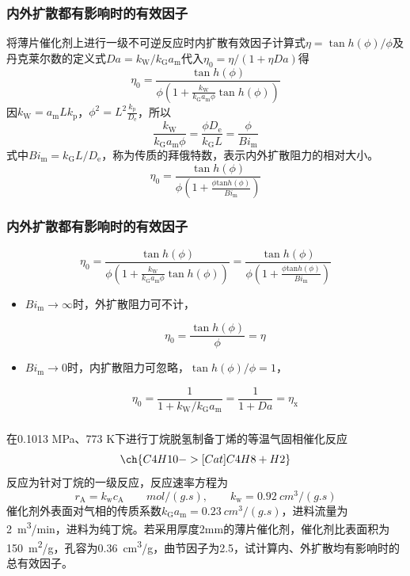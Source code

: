\documentclass[dvipsnames, svgnames, x11names]{beamer}
\begin{document}
\begin{frame}
    \frametitle{内外扩散都有影响时的有效因子}

    将薄片催化剂上进行一级不可逆反应时内扩散有效因子计算式$\eta = \tan h(\phi)/\phi$及丹克莱尔数的定义式$Da = k_{\mathrm{W}}/{k_{\mathrm{G}} a_{\mathrm{m}}}$代入$\eta_{0}=\eta /(1+\eta D a)$得
    \[
        \eta_{0}=\frac{\tan h(\phi)}{\phi (1+\frac{k_{\mathrm{W}}}{k_{\mathrm{G}} a_{\mathrm{m}} \phi} \tan h(\phi))}
    \]
    因$k_{\mathrm{W}} = a_{\mathrm{m}} L k_{\mathrm{p}}$，$\phi ^2 = L^2 \frac{k_{\mathrm{p}}}{D_{\mathrm{e}}}$，所以
    \[
        \frac{k_{\mathrm{W}}}{k_{\mathrm{G}} a_{\mathrm{m}} \phi}=\frac{\phi D_{\mathrm{e}}}{k_{\mathrm{G}} L}=\frac{\phi}{B i_{\mathrm{m}}}
    \]
    式中$B i_{\mathrm{m}} = k_{\mathrm{G}} L/D_{\mathrm{e}}$，称为传质的拜俄特数，表示内外扩散阻力的相对大小。
    \[
        \eta_{0}=\frac{\tan h(\phi)}{\phi\left(1+\frac{\phi \mathrm{tan} h(\phi)}{B i_{\mathrm{m}}}\right)}
    \]
    

\end{frame}


\begin{frame}
    \frametitle{内外扩散都有影响时的有效因子}

    \[
        \eta_{0}=\frac{\tan h(\phi)}{\phi (1+\frac{k_{\mathrm{W}}}{k_{\mathrm{G}} a_{\mathrm{m}} \phi} \tan h(\phi))}=\frac{\tan h(\phi)}{\phi\left(1+\frac{\phi \mathrm{tan} h(\phi)}{B i_{\mathrm{m}}}\right)}
    \]
    \begin{itemize}
        \item $B i_{\mathrm{m}} \to \infty$时，外扩散阻力可不计，
        
        \[
            \eta_{0}= \frac{\tan h(\phi)}{\phi} = \eta
        \]
        \item $B i_{\mathrm{m}} \to 0$时，内扩散阻力可忽略，$\tan h(\phi)/{\phi} =1$，
        
        \[
            \eta_{0}= \frac{1}{1 + k_{\mathrm{W}}/k_{\mathrm{G}} a_{\mathrm{m}}} = \frac{1}{1 + Da} = \eta_ \mathrm{x}
        \]
    \end{itemize}

\end{frame}


\begin{frame}[t]
    \frametitle{}

    \begin{example}
        在0.1013 MPa、773 K下进行丁烷脱氢制备丁烯的等温气固相催化反应
        \[
            \ch{C4H10 ->[Cat] C4H8 + H2}
        \]
        反应为针对丁烷的一级反应，反应速率方程为
        \[
            r_\mathrm{A} = k_\mathrm{w} c_\mathrm{A} \qquad \si{mol/(g.s)}, \qquad k_\mathrm{w} = \SI{0.92}{cm^3/(g.s)}
        \]
        催化剂外表面对气相的传质系数$k_{\mathrm{G}} a_{\mathrm{m}} = \SI{0.23}{cm^3/(g.s)}$，进料流量为\SI{2}{m^3/min}，进料为纯丁烷。若采用厚度2mm的薄片催化剂，催化剂比表面积为\SI{150}{m^2/g}，孔容为\SI{0.36}{cm^3/g}，曲节因子为2.5，试计算内、外扩散均有影响时的总有效因子。
    \end{example}

\end{frame}
\end{document}
